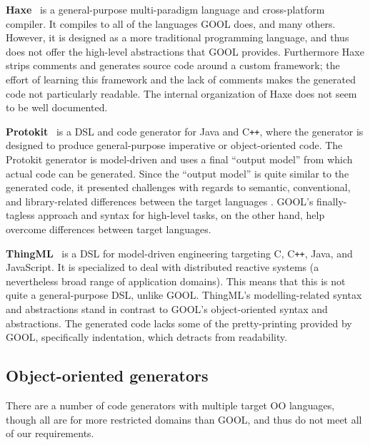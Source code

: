 \documentclass[sigplan,review,prologue,dvipsnames]{acmart}
\newcommand{\Cplusplus}{C\texttt{++}}
\begin{document}
\textbf{Haxe}~\cite{Haxe} is a general-purpose multi-paradigm language and cross-platform
compiler.  It compiles to all of the languages GOOL does, and many
others.  However, it is designed as a more traditional programming language, and
thus does not offer the high-level abstractions that GOOL provides. Furthermore
Haxe strips comments and generates source code around a custom framework; 
the effort of learning this framework and the lack of comments makes the generated
code not particularly readable. The internal organization of Haxe does not seem
to be well documented.

\textbf{Protokit}~\cite{kovesdan2017multi} is a DSL and code generator for Java and
\Cplusplus, where the generator is designed to produce
general-purpose imperative or object-oriented code. The Protokit generator is
model-driven and uses a final ``output model'' from which actual code can be
generated. Since the ``output model'' is quite similar to the generated
code, it presented challenges with regards to semantic, conventional, and
library-related differences between the target languages
\cite{kovesdan2017multi}. GOOL's finally-tagless approach and syntax for
high-level tasks, on the other hand, help overcome differences between
target languages.

\textbf{ThingML}~\cite{harrand2016thingml} is a DSL for model-driven engineering
targeting C, \Cplusplus, Java, and JavaScript. It is specialized to deal with
distributed reactive systems (a nevertheless broad range of application domains).
This means that this is not quite a general-purpose DSL, unlike GOOL.
ThingML's modelling-related syntax and abstractions stand in contrast to GOOL's
object-oriented syntax and abstractions. The generated code lacks some of the
pretty-printing provided by GOOL, specifically indentation, which detracts from
readability.

\subsection{Object-oriented generators}

There are a number of code generators with multiple target OO languages,
though all are for more restricted domains than GOOL, and thus do not meet all
of our requirements.
\end{document}
